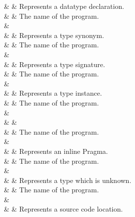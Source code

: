 \begin{haddockdesc}
\haddockdecltt{|} &  & Represents a datatype declaration. \\
                                               & \haddocktt{\qquad \{}  & The name of the program. \\ & \haddocktt{\qquad \}} \\
\haddockdecltt{|} &  & Represents a type synonym. \\
                                                  & \haddocktt{\qquad \{}  & The name of the program. \\ & \haddocktt{\qquad \}} \\
\haddockdecltt{|} &  & Represents a type signature. \\
                                                    & \haddocktt{\qquad \{}  & The name of the program. \\ & \haddocktt{\qquad \}} \\
\haddockdecltt{|} &  & Represents a type instance. \\
                                                & \haddocktt{\qquad \{}  & The name of the program. \\ & \haddocktt{\qquad \}} \\
\haddockdecltt{|} &  & \\
                                               & \haddocktt{\qquad \{}  & The name of the program. \\ & \haddocktt{\qquad \}} \\
\haddockdecltt{|} &  & Represents an inline Pragma. \\
                                             & \haddocktt{\qquad \{}  & The name of the program. \\ & \haddocktt{\qquad \}} \\
\haddockdecltt{|} &  & Represents a type which is unknown. \\
                                                  & \haddocktt{\qquad \{}  & The name of the program. \\ & \haddocktt{\qquad \}} \\
\haddockdecltt{|} &  & Represents a source code location. \\

\end{haddockdesc}
